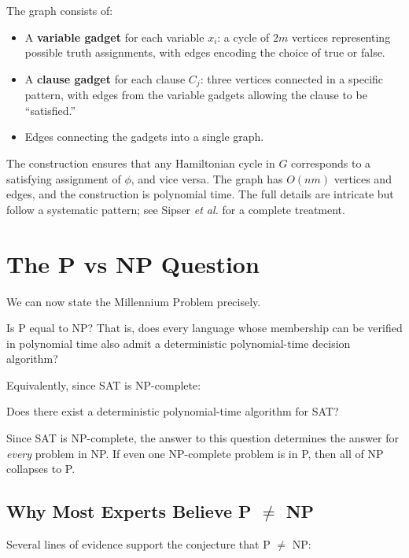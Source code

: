 The graph consists of:
\begin{itemize}
  \item A \textbf{variable gadget} for each variable $x_i$: a cycle of $2m$ vertices representing possible truth assignments, with edges encoding the choice of true or false.
  \item A \textbf{clause gadget} for each clause $C_j$: three vertices connected in a specific pattern, with edges from the variable gadgets allowing the clause to be ``satisfied.''
  \item Edges connecting the gadgets into a single graph.
\end{itemize}

The construction ensures that any Hamiltonian cycle in $G$ corresponds to a satisfying assignment of $\phi$, and vice versa. The graph has $O(nm)$ vertices and edges, and the construction is polynomial time. The full details are intricate but follow a systematic pattern; see Sipser \emph{et al.} for a complete treatment.

\section{The P vs NP Question}

We can now state the Millennium Problem precisely.

\begin{problem}[P vs NP]
Is P equal to NP? That is, does every language whose membership can be verified in polynomial time also admit a deterministic polynomial-time decision algorithm?
\end{problem}

Equivalently, since SAT is NP-complete:

\begin{problem}
Does there exist a deterministic polynomial-time algorithm for SAT?
\end{problem}

Since SAT is NP-complete, the answer to this question determines the answer for \emph{every} problem in NP. If even one NP-complete problem is in P, then all of NP collapses to P.

\subsection{Why Most Experts Believe P $\neq$ NP}

Several lines of evidence support the conjecture that P $\neq$ NP:


